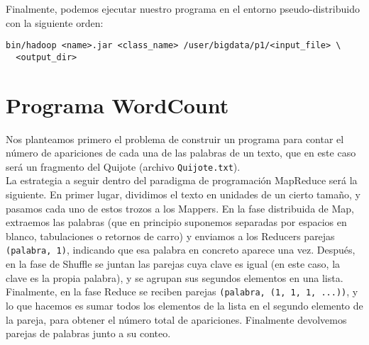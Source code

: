 \documentclass[11pt]{article}
\begin{document}
Finalmente, podemos ejecutar nuestro programa en el entorno pseudo-distribuido con la siguiente orden:

\begin{verbatim}
bin/hadoop <name>.jar <class_name> /user/bigdata/p1/<input_file> \
  <output_dir>
\end{verbatim}

\section{Programa WordCount}

Nos planteamos primero el problema de construir un programa para contar el número de apariciones de cada una de las palabras de un texto, que en este caso será un fragmento del Quijote (archivo \verb|Quijote.txt|).\\

La estrategia a seguir dentro del paradigma de programación MapReduce será la siguiente. En primer lugar, dividimos el texto en unidades de un cierto tamaño, y pasamos cada uno de estos trozos a los Mappers. En la fase distribuida de Map, extraemos las palabras (que en principio suponemos separadas por espacios en blanco, tabulaciones o retornos de carro) y enviamos a los Reducers parejas \verb|(palabra, 1)|, indicando que esa palabra en concreto aparece una vez. Después, en la fase de Shuffle se juntan las parejas cuya clave es igual (en este caso, la clave es la propia palabra), y se agrupan sus segundos elementos en una lista. Finalmente, en la fase Reduce se reciben parejas \verb|(palabra, (1, 1, 1, ...))|, y lo que hacemos es sumar todos los elementos de la lista en el segundo elemento de la pareja, para obtener el número total de apariciones. Finalmente devolvemos parejas de palabras junto a su conteo.
\end{document}
